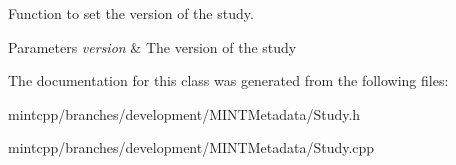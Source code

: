 Function to set the version of the study. 


\begin{DoxyParams}{Parameters}
{\em version} & The version of the study \\
\hline
\end{DoxyParams}


The documentation for this class was generated from the following files:\begin{DoxyCompactItemize}
\item 
mintcpp/branches/development/MINTMetadata/Study.h\item 
mintcpp/branches/development/MINTMetadata/Study.cpp\end{DoxyCompactItemize}
